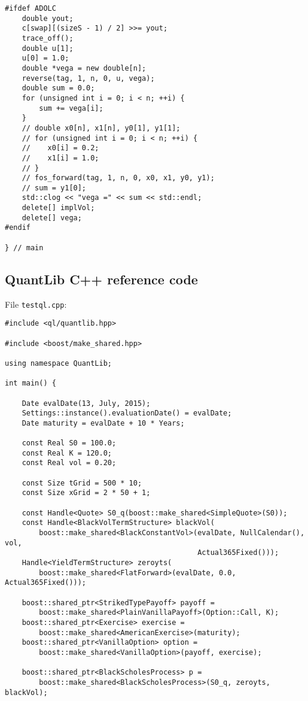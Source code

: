 \documentclass{amsart}
\theoremstyle{plain}
\numberwithin{equation}{section}
\begin{document}
\begin{appendix}
\begin{verbatim}
#ifdef ADOLC
    double yout;
    c[swap][(sizeS - 1) / 2] >>= yout;
    trace_off();
    double u[1];
    u[0] = 1.0;
    double *vega = new double[n];
    reverse(tag, 1, n, 0, u, vega);
    double sum = 0.0;
    for (unsigned int i = 0; i < n; ++i) {
        sum += vega[i];
    }
    // double x0[n], x1[n], y0[1], y1[1];
    // for (unsigned int i = 0; i < n; ++i) {
    //    x0[i] = 0.2;
    //    x1[i] = 1.0;
    // }
    // fos_forward(tag, 1, n, 0, x0, x1, y0, y1);
    // sum = y1[0];
    std::clog << "vega =" << sum << std::endl;
    delete[] implVol;
    delete[] vega;
#endif

} // main
\end{verbatim}

\subsection{QuantLib C++ reference code}

File \verb+testql.cpp+:

\begin{verbatim}
#include <ql/quantlib.hpp>

#include <boost/make_shared.hpp>

using namespace QuantLib;

int main() {

    Date evalDate(13, July, 2015);
    Settings::instance().evaluationDate() = evalDate;
    Date maturity = evalDate + 10 * Years;

    const Real S0 = 100.0;
    const Real K = 120.0;
    const Real vol = 0.20;

    const Size tGrid = 500 * 10;
    const Size xGrid = 2 * 50 + 1;

    const Handle<Quote> S0_q(boost::make_shared<SimpleQuote>(S0));
    const Handle<BlackVolTermStructure> blackVol(
        boost::make_shared<BlackConstantVol>(evalDate, NullCalendar(), vol,
                                             Actual365Fixed()));
    Handle<YieldTermStructure> zeroyts(
        boost::make_shared<FlatForward>(evalDate, 0.0, Actual365Fixed()));

    boost::shared_ptr<StrikedTypePayoff> payoff =
        boost::make_shared<PlainVanillaPayoff>(Option::Call, K);
    boost::shared_ptr<Exercise> exercise =
        boost::make_shared<AmericanExercise>(maturity);
    boost::shared_ptr<VanillaOption> option =
        boost::make_shared<VanillaOption>(payoff, exercise);

    boost::shared_ptr<BlackScholesProcess> p =
        boost::make_shared<BlackScholesProcess>(S0_q, zeroyts, blackVol);


\end{verbatim}
\end{appendix}
\end{document}

